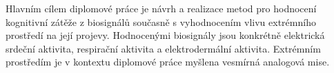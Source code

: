 Hlavním cílem diplomové práce je návrh a realizace metod pro hodnocení
kognitivní zátěže z biosignálů současně s vyhodnocením vlivu extrémního
prostředí na její projevy. Hodnocenými biosignály jsou konkrétně elektrická
srdeční aktivita, respirační aktivita a elektrodermální aktivita. Extrémním
prostředím je v kontextu diplomové práce myšlena vesmírná analogová mise.
